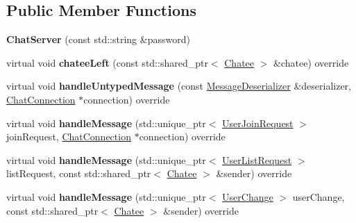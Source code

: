 \subsection*{Public Member Functions}
\begin{DoxyCompactItemize}
\item 
\hypertarget{classSimpleChat_1_1ChatServer_a7f0056a5e7e352a16440fe4d1d5ff653}{{\bfseries Chat\-Server} (const std\-::string \&password)}\label{classSimpleChat_1_1ChatServer_a7f0056a5e7e352a16440fe4d1d5ff653}

\item 
\hypertarget{classSimpleChat_1_1ChatServer_aa47af706bc2dee5a9d446b53d0d04b00}{virtual void {\bfseries chatee\-Left} (const std\-::shared\-\_\-ptr$<$ \hyperlink{classSimpleChat_1_1Chatee}{Chatee} $>$ \&chatee) override}\label{classSimpleChat_1_1ChatServer_aa47af706bc2dee5a9d446b53d0d04b00}

\item 
\hypertarget{classSimpleChat_1_1ChatServer_a9b54ceb324dd24f9ab44217f8d5c4618}{virtual void {\bfseries handle\-Untyped\-Message} (const \hyperlink{classSimpleChat_1_1MessageDeserializer}{Message\-Deserializer} \&deserializer, \hyperlink{classSimpleChat_1_1ChatConnection}{Chat\-Connection} $\ast$connection) override}\label{classSimpleChat_1_1ChatServer_a9b54ceb324dd24f9ab44217f8d5c4618}

\item 
\hypertarget{classSimpleChat_1_1ChatServer_a4761fa8ac8451b2aed8bfe7f2b095cea}{virtual void {\bfseries handle\-Message} (std\-::unique\-\_\-ptr$<$ \hyperlink{classSimpleChat_1_1UserJoinRequest}{User\-Join\-Request} $>$ join\-Request, \hyperlink{classSimpleChat_1_1ChatConnection}{Chat\-Connection} $\ast$connection) override}\label{classSimpleChat_1_1ChatServer_a4761fa8ac8451b2aed8bfe7f2b095cea}

\item 
\hypertarget{classSimpleChat_1_1ChatServer_a6190e6309f6a01f87f8269c2756904f9}{virtual void {\bfseries handle\-Message} (std\-::unique\-\_\-ptr$<$ \hyperlink{classSimpleChat_1_1UserListRequest}{User\-List\-Request} $>$ list\-Request, const std\-::shared\-\_\-ptr$<$ \hyperlink{classSimpleChat_1_1Chatee}{Chatee} $>$ \&sender) override}\label{classSimpleChat_1_1ChatServer_a6190e6309f6a01f87f8269c2756904f9}

\item 
\hypertarget{classSimpleChat_1_1ChatServer_a7506c5bb2bf79b6d1fbac9c16e901f42}{virtual void {\bfseries handle\-Message} (std\-::unique\-\_\-ptr$<$ \hyperlink{classSimpleChat_1_1UserChange}{User\-Change} $>$ user\-Change, const std\-::shared\-\_\-ptr$<$ \hyperlink{classSimpleChat_1_1Chatee}{Chatee} $>$ \&sender) override}\label{classSimpleChat_1_1ChatServer_a7506c5bb2bf79b6d1fbac9c16e901f42}


\end{DoxyCompactItemize}
